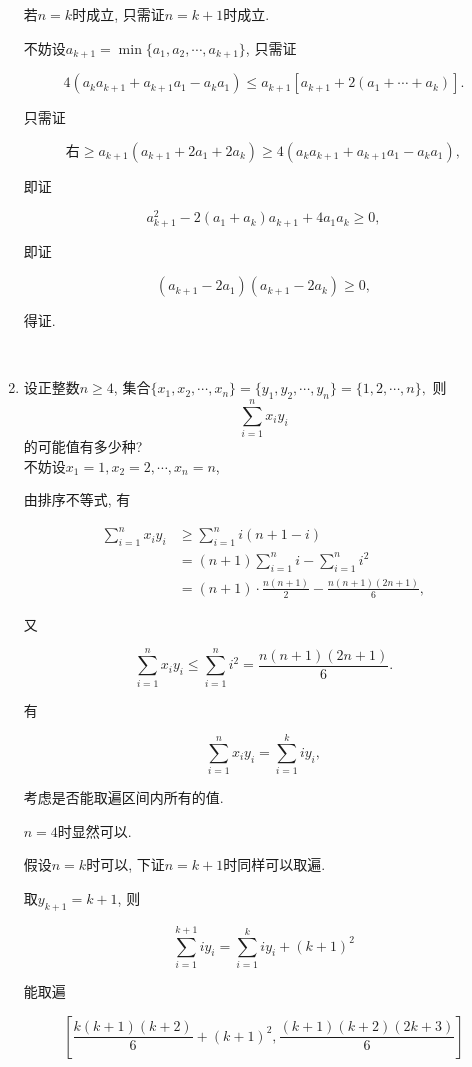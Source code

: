 \documentclass[8pt]{article}
\begin{document}
\begin{enumerate}
			若$n=k$时成立, 只需证$n=k+1$时成立.

			不妨设$a_{k+1} = \min \{a_1, a_2, \cdots, a_{k+1}\}$, 只需证

			$$4(a_k a_{k+1} + a_{k+1} a_1 - a_k a_1) \leq a_{k+1} [a_{k+1} + 2(a_1 + \cdots + a_k)].$$

			只需证

			$$\text{右} \geq a_{k+1} (a_{k+1} + 2a_1 + 2a_k) \geq 4(a_k a_{k+1} + a_{k+1} a_1 - a_k a_1),$$

			即证

			$$a_{k+1}^2 - 2(a_1 + a_k) a_{k+1} + 4 a_1 a_k \geq 0,$$

			即证

			$$(a_{k+1} - 2a_1) (a_{k+1} - 2a_k) \geq 0,$$

			得证.

		~\\

		\item 设正整数$n \geq 4$, 集合$\{x_1, x_2, \cdots, x_n\} = \{y_1, y_2, \cdots, y_n \} = \{1, 2, \cdots, n\},$ 则$$\sum_{i=1}^{n} x_i y_i$$的可能值有多少种?
			~\\

			不妨设$x_1 = 1, x_2 = 2, \cdots, x_n = n$,

			由排序不等式, 有

			\begin{align*}
				\sum_{i=1}^{n} x_i y_i &\geq \sum_{i=1}^{n} i(n+1-i)\\
				&= (n+1)\sum_{i=1}^{n} i - \sum_{i=1}^{n} i^2\\
				&= (n+1) \cdot \frac{n(n+1)}{2} - \frac{n(n+1)(2n+1)}{6},
			\end{align*}

			又

			$$\sum_{i=1}^{n} x_i y_i \leq \sum_{i=1}^{n} i^2 = \frac{n(n+1)(2n+1)}{6}.$$

			有

			$$\sum_{i=1}^{n} x_i y_i = \sum_{i=1}^{k} i y_i,$$

			考虑是否能取遍区间内所有的值.

			$n=4$时显然可以.

			假设$n=k$时可以, 下证$n=k+1$时同样可以取遍.

			取$y_{k+1} = k+1$, 则

			$$\sum_{i=1}^{k+1} i y_i = \sum_{i=1}^{k} i y_i + (k+1)^2$$

			能取遍

			$$\left[\frac{k(k+1)(k+2)}{6}+(k+1)^2, \frac{(k+1)(k+2)(2k+3)}{6}\right]$$


\end{enumerate}
\end{document}
